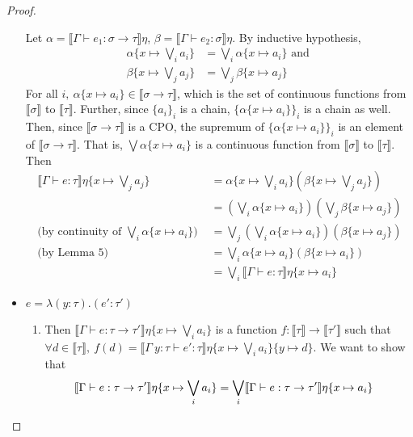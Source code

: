 \begin{proof}
\begin{itemize}
Let $\alpha = \llbracket \Gamma \vdash e_1 : \sigma \rightarrow \tau \rrbracket\eta$,  $\beta = \llbracket \Gamma \vdash e_2 : \sigma \rrbracket\eta$. By inductive hypothesis, 
\begin{align*}
\alpha\{x\mapsto \bigvee _i a_i\} &= \bigvee_i \alpha\{x \mapsto a_i\} \text{ and }\\
\beta\{x\mapsto \bigvee _j a_j\} &= \bigvee_j \beta\{x \mapsto a_j\} 
\end{align*}
For all $i, \ \alpha\{x \mapsto a_i\} \in \llbracket \sigma \rightarrow \tau \rrbracket$, which is 
 the set of continuous functions from $\llbracket \sigma \rrbracket$ to $\llbracket \tau \rrbracket$. Further, since
 $\{a_i\}_i$ is a chain, $\{\alpha\{x \mapsto a_i\}\}_i$ is a chain as well. Then, since $\llbracket \sigma \rightarrow 
 \tau\rrbracket$ is a CPO, the supremum of $\{\alpha\{x \mapsto a_i\}\}_i$ is an element of $\llbracket \sigma \rightarrow 
 \tau\rrbracket$. That is, $\bigvee \alpha\{x \mapsto a_i\}$ is a continuous function from 
 $\llbracket \sigma \rrbracket$ to $\llbracket \tau \rrbracket$. Then
\begin{align*}
\llbracket \Gamma \vdash e : \tau \rrbracket\eta\{x \mapsto \bigvee_j a_j\} &=
	\alpha\{x\mapsto \bigvee _i a_i\}(\beta\{x\mapsto \bigvee _j a_j\}) \\
&=  (\bigvee_i \alpha\{x \mapsto a_i\})(\bigvee_j \beta\{x \mapsto a_j\}) \\
\text{(by continuity of $\bigvee_i \alpha\{x \mapsto a_i\}$) }&= \bigvee_j(\bigvee_i \alpha\{x \mapsto a_i \})(\beta\{ x \mapsto a_j\}) \\
\text{(by Lemma 5)}&= \bigvee_i \alpha\{x \mapsto a_i \}(\beta\{ x \mapsto a_i\}) \\
&= \bigvee_i \llbracket \Gamma \vdash e : \tau\rrbracket\eta\{x \mapsto a_i\}
\end{align*}
 \item $e = \lambda (y : \tau) . (e' : \tau')$
 \begin{enumerate}
 \item Then $\llbracket \Gamma \vdash e : \tau \rightarrow \tau' \rrbracket\eta\{x\mapsto  \bigvee_i a_i\}$ 
 is a function $f: \llbracket \tau \rrbracket \rightarrow \llbracket \tau'  \rrbracket$ such that 
 $\forall d \in \llbracket \tau \rrbracket, \ f(d) = \llbracket \Gamma \ y : \tau \vdash e' : \tau 
 \rrbracket\eta\{x\mapsto  \bigvee_i a_i\}\{y \mapsto d\}$. We want to show that
 \begin{align*}
 \llbracket{{\Gamma}\vdash{e}:{\tau} \rightarrow \tau'}\rrbracket{\eta\{{x}\mapsto{\bigvee_i a_i}\}} &=
\bigvee_i\llbracket{{\Gamma}\vdash{e}:{\tau} \rightarrow \tau'}\rrbracket{\eta\{{x}\mapsto{a_i}\}}
\end{align*}
 

\end{enumerate}
\end{itemize}
\end{proof}
